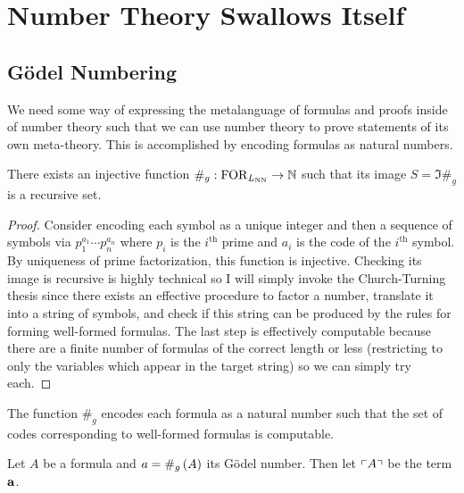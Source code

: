 \documentclass[12pt]{article}
\begin{document}
\section{Number Theory Swallows Itself}



\subsection{G\"{o}del Numbering}

We need some way of expressing the metalanguage of formulas and proofs inside of number theory such that we can use number theory to prove statements of its own meta-theory. This is accomplished by encoding formulas as natural numbers. 

\begin{theorem}
There exists an injective function $\#_g : \FOR{L_{\mathrm{NN}}} \to \N$ such that its image $S = \Im{\#_g}$ is a recursive set. 
\end{theorem}

\begin{proof}
Consider encoding each symbol as a unique integer and then a sequence of symbols via $p_1^{a_1} \cdots p_n^{a_n}$ where $p_i$ is the $i^{\text{th}}$ prime and $a_i$ is the code of the $i^{\text{th}}$ symbol. By uniqueness of prime factorization, this function is injective. Checking its image is recursive is highly technical so I will simply invoke the Church-Turning thesis since there exists an effective procedure to factor a number, translate it into a string of symbols, and check if this string can be produced by the rules for forming well-formed formulas. The last step is effectively computable because there are a finite number of formulas of the correct length or less (restricting to only the variables which appear in the target string) so we can simply try each. 
\end{proof}

\begin{remark}
The function $\#_g$ encodes each formula as a natural number such that the set of codes corresponding to well-formed formulas is computable. 
\end{remark}

\begin{definition}
Let $A$ be a formula and $a = \Gnum{A}$ its G\"{o}del number. Then let $\Gterm{A}$ be the term $\bf{a}$. 
\end{definition}
\end{document}
